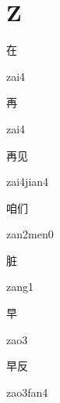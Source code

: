 ﻿%
\section*{Z}
\begin{multicols*}{2}

\begin{verbete}[zai4]{在}
\begin{pronuncia}{zai4}
\end{pronuncia}
\end{verbete}

\begin{verbete}[zai4]{再}
\begin{pronuncia}{zai4}
\end{pronuncia}
\end{verbete}

\begin{verbete}{再见}
\begin{pronuncia}{zai4jian4}
\end{pronuncia}
\end{verbete}

\begin{verbete}{咱们}
\begin{pronuncia}{zan2men0}
\end{pronuncia}
\end{verbete}

\begin{verbete}[zang1]{脏}
\begin{pronuncia}{zang1}
\end{pronuncia}
\end{verbete}

\begin{verbete}[zao3]{早}
\begin{pronuncia}{zao3}
\end{pronuncia}
\end{verbete}

\begin{verbete}{早反}
\begin{pronuncia}{zao3fan4}
\end{pronuncia}
\end{verbete}


\end{multicols*}
